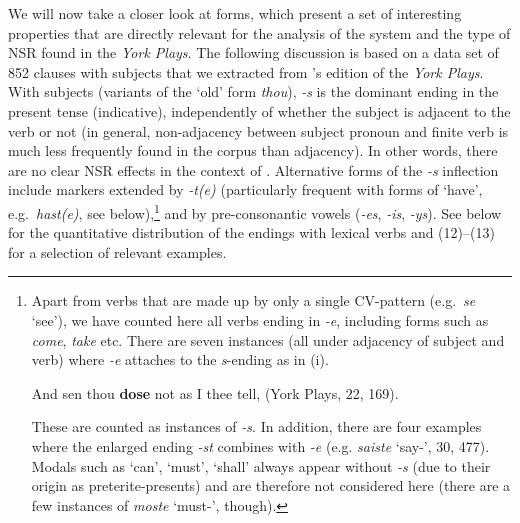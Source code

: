 \documentclass[output=paper]{langsci/langscibook}
\begin{document}
We will now take a closer look at \Ssg{} forms, which present a set of interesting properties that are directly relevant for the analysis of the  system and the type of \gls{NSR} found in the \emph{York Plays}. The following discussion is based on a data set of 852 clauses with \Ssg{} subjects that we extracted from \cite{Davidson:2011}'s edition of the \emph{York Plays}.
With \Ssg{} subjects (variants of the ‘old' form \emph{thou}), \emph{-s} is the
dominant ending in the present tense (indicative), independently of whether the
subject is adjacent to the verb or not (in general, non-adjacency between
subject pronoun and finite verb is much less frequently found in the corpus
than adjacency). In other words, there are no clear \gls{NSR} effects in the context of \Ssg{}. Alternative forms of the
    \emph{-s} inflection include markers extended by \emph{-t(e)} (particularly
    frequent with forms of ‘have’, e.g.\ \emph{hast(e)}, see
     below),\footnote{Apart from verbs that
        are made up by only a single CV-pattern (e.g.\ \emph{se} `see'), we
        have counted here all verbs ending in \emph{-e}, including forms such
        as \emph{come}, \emph{take} etc. There are seven instances (all under
        adjacency of subject and verb) where \emph{-e} attaches to the
        \emph{s}-ending as in (i).

    \begin{exe}
         And sen thou \textbf{dose} not as I thee tell,
        \glt (York Plays, 22, 169).
    \end{exe}
    These are counted as instances of \emph{-s}. In addition, there are four
    examples where the enlarged ending \emph{-st} combines with \emph{-e} (e.g.
    \emph{saiste} `say-\Ssg{}', 30, 477). Modals such as `can', `must', `shall'
    always appear without \emph{-s} (due to their origin as preterite-presents) and are
    therefore not considered here (there are a few instances of \emph{moste}
‘must-\Ssg{}', though).} and by pre-consonantic vowels (\emph{-es},
\emph{-is}, \emph{-ys}). See  below for the quantitative
distribution of the \Ssg{} endings with lexical verbs and (12)--(13) for a
selection of relevant examples.
\end{document}
